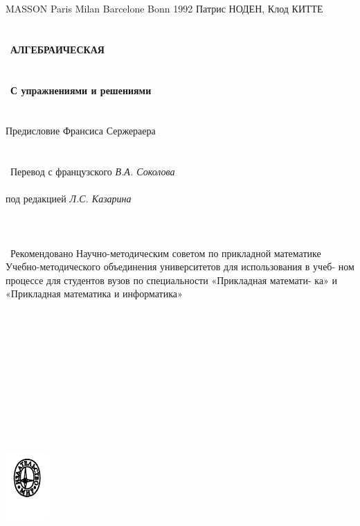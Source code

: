 \documentclass{mai_book}
\begin{document}
\hspace{2.0in} MASSON Paris Milan Barcelone Bonn 1992
\newpage
\large {Патрис НОДЕН},    \large {Клод КИТТЕ}
\\\\\\\
{\Huge \textbf {АЛГЕБРАИЧЕСКАЯ}}
\\
\\\\\
\textbf{С упражнениями и решениями}
\\\\\\
\newline Предисловие Франсиса Сержераера
\\\\\\\
Перевод с французского
\newline \textit{В.А. Соколова}
\\\\
под редакцией
\newline \textit {Л.С. Казарина}
\\\\\\\\\
\small {Рекомендовано Научно-методическим советом по прикладной математике
\newline Учебно-методического объединения университетов для использования в учеб-
\newline ном процессе для студентов вузов по специальности «Прикладная математи-
\newline ка» и «Прикладная математика и информатика»}
\\\\\\\\\\\\\\\\\\\\\\\\
\includegraphics[keyval-list]{2.png}
\end{document}
